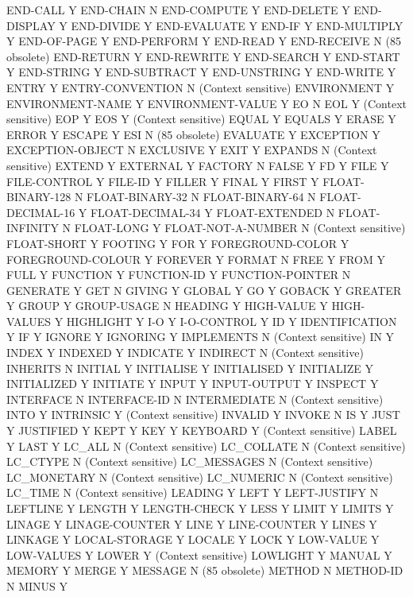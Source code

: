 END-CALL			Y
END-CHAIN			N
END-COMPUTE			Y
END-DELETE			Y
END-DISPLAY			Y
END-DIVIDE			Y
END-EVALUATE			Y
END-IF				Y
END-MULTIPLY			Y
END-OF-PAGE			Y
END-PERFORM			Y
END-READ			Y
END-RECEIVE			N (85 obsolete)
END-RETURN			Y
END-REWRITE			Y
END-SEARCH			Y
END-START			Y
END-STRING			Y
END-SUBTRACT			Y
END-UNSTRING			Y
END-WRITE			Y
ENTRY				Y
ENTRY-CONVENTION		N (Context sensitive)
ENVIRONMENT			Y
ENVIRONMENT-NAME		Y
ENVIRONMENT-VALUE		Y
EO				N
EOL				Y (Context sensitive)
EOP				Y
EOS				Y (Context sensitive)
EQUAL				Y
EQUALS				Y
ERASE				Y
ERROR				Y
ESCAPE				Y
ESI				N (85 obsolete)
EVALUATE			Y
EXCEPTION			Y
EXCEPTION-OBJECT		N
EXCLUSIVE			Y
EXIT				Y
EXPANDS				N (Context sensitive)
EXTEND				Y
EXTERNAL			Y
FACTORY				N
FALSE				Y
FD				Y
FILE				Y
FILE-CONTROL			Y
FILE-ID				Y
FILLER				Y
FINAL				Y
FIRST				Y
FLOAT-BINARY-128		N
FLOAT-BINARY-32			N
FLOAT-BINARY-64			N
FLOAT-DECIMAL-16		Y
FLOAT-DECIMAL-34		Y
FLOAT-EXTENDED			N
FLOAT-INFINITY			N
FLOAT-LONG			Y
FLOAT-NOT-A-NUMBER		N (Context sensitive)
FLOAT-SHORT			Y
FOOTING				Y
FOR				Y
FOREGROUND-COLOR		Y
FOREGROUND-COLOUR		Y
FOREVER				Y
FORMAT				N
FREE				Y
FROM				Y
FULL				Y
FUNCTION			Y
FUNCTION-ID			Y
FUNCTION-POINTER		N
GENERATE			Y
GET				N
GIVING				Y
GLOBAL				Y
GO				Y
GOBACK				Y
GREATER				Y
GROUP				Y
GROUP-USAGE			N
HEADING				Y
HIGH-VALUE			Y
HIGH-VALUES			Y
HIGHLIGHT			Y
I-O				Y
I-O-CONTROL			Y
ID				Y
IDENTIFICATION			Y
IF				Y
IGNORE				Y
IGNORING			Y
IMPLEMENTS			N (Context sensitive)
IN				Y
INDEX				Y
INDEXED				Y
INDICATE			Y
INDIRECT			N (Context sensitive)
INHERITS			N
INITIAL				Y
INITIALISE			Y
INITIALISED			Y
INITIALIZE			Y
INITIALIZED			Y
INITIATE			Y
INPUT				Y
INPUT-OUTPUT			Y
INSPECT				Y
INTERFACE			N
INTERFACE-ID			N
INTERMEDIATE			N (Context sensitive)
INTO				Y
INTRINSIC			Y (Context sensitive)
INVALID				Y
INVOKE				N
IS				Y
JUST				Y
JUSTIFIED			Y
KEPT				Y
KEY				Y
KEYBOARD			Y (Context sensitive)
LABEL				Y
LAST				Y
LC_ALL				N (Context sensitive)
LC_COLLATE			N (Context sensitive)
LC_CTYPE			N (Context sensitive)
LC_MESSAGES			N (Context sensitive)
LC_MONETARY			N (Context sensitive)
LC_NUMERIC			N (Context sensitive)
LC_TIME				N (Context sensitive)
LEADING				Y
LEFT				Y
LEFT-JUSTIFY			N
LEFTLINE			Y
LENGTH				Y
LENGTH-CHECK			Y
LESS				Y
LIMIT				Y
LIMITS				Y
LINAGE				Y
LINAGE-COUNTER			Y
LINE				Y
LINE-COUNTER			Y
LINES				Y
LINKAGE				Y
LOCAL-STORAGE			Y
LOCALE				Y
LOCK				Y
LOW-VALUE			Y
LOW-VALUES			Y
LOWER				Y (Context sensitive)
LOWLIGHT			Y
MANUAL				Y
MEMORY				Y
MERGE				Y
MESSAGE				N (85 obsolete)
METHOD				N
METHOD-ID			N
MINUS				Y
